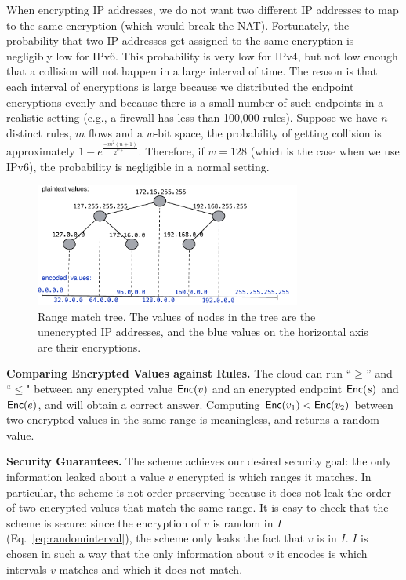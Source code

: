 When encrypting IP addresses, we do not want two different IP addresses to map to the same encryption (which would break the NAT). Fortunately, the probability that two IP addresses get assigned to the same encryption is negligibly low for IPv6. This probability is very low for IPv4, but not low enough that a collision will not happen in a large interval of time. The reason is that each interval of encryptions is large because we distributed the endpoint encryptions evenly and because there is a small number of such endpoints in a realistic setting (e.g., a firewall has less than 100,000 rules). Suppose we have $n$ distinct rules, $m$ flows and a $w$-bit space, the probability of getting collision is approximately $1-e^\frac{-m^2 (n+1)}{2^{w+1}}$. Therefore, if $w=128$ (which is the case when we use IPv6), the probability is negligible in a normal setting. 
\begin{figure}
  \includegraphics[width=3.45in]{fig/tree}
  \caption{\label{fig:tree} Range match tree. The values of nodes in the tree are the unencrypted IP addresses, and the blue values on the horizontal axis are their encryptions. }
\end{figure}

\textbf{Comparing Encrypted Values against Rules.}
The cloud can run ``$\ge$'' and ``$\le$" between any encrypted value $\mathsf{Enc}(v)$ and an encrypted endpoint $\mathsf{Enc}(s)$ and $\mathsf{Enc}(e)$, and will obtain a correct answer. Computing $\mathsf{Enc}(v_1) < \mathsf{Enc}(v_2)$  between two encrypted values in the same range is meaningless, and returns a random value.





\textbf{Security Guarantees.}
The scheme achieves our desired security goal: the only information leaked about a value $v$ encrypted is which ranges it matches. 
In particular, the scheme is not order preserving because it does not leak the order of two encrypted values that match the same range. It is easy to check that the scheme is secure: since the encryption of $v$ is random in $I$ (Eq.~\ref{eq:randominterval}), the scheme only leaks the fact that $v$ is in $I$. $I$ is chosen in such a way that the only information about $v$ it encodes is which intervals $v$ matches and which it does not match.

